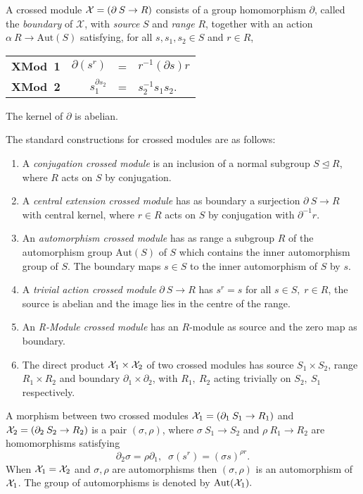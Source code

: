 A crossed module  ${\cal X} = (\partial \: S \to R )$ 
consists of a group homomorphism $\partial $, 
called the {\em boundary} of $\mathcal{X}$, 
with {\em source} $S$  and {\em range} $R$,
together with an action 
$\alpha \: R \to \mathrm{Aut}(S)$ satisfying,  
for all $s,s_1,s_2 \in S$  and  $r \in R$,
\begin{center}
\begin{tabular}{c r c l }
\textbf{XMod\ 1\:} &  $\partial(s^r)$   &  =  &  $r^{-1} (\partial s) r$ \\
\textbf{XMod\ 2\:} &  $s_1^{\partial s_2}$  &  =  &  $s_2^{-1}s_1 s_2$.
\end{tabular}
\end{center}
The kernel of  $\partial$  is abelian.


The standard constructions for crossed modules are as follows:

\begin{enumerate}
\item A {\em conjugation crossed module}
      is an inclusion of a normal subgroup  $S \unlhd R$,
      where $R$ acts on $S$ by conjugation.
\item A {\em central extension crossed module} has as boundary a surjection
      $\partial \: S \to R$ with central kernel,
      where $r \in R$ acts on $S$ by conjugation with $\partial^{-1}r$.
\item An {\em automorphism crossed module} has as range a subgroup $R$
      of the automorphism group  $\mbox{Aut}(S)$  of  $S$
      which contains the inner automorphism group of $S$.
      The boundary maps $s \in S$  to the inner automorphism of $S$ by $s$.
\item A {\em trivial action crossed module}  $\partial \: S \to R$
      has  $s^r = s$  for all  $s \in S, \; r \in R$,  
      the source is abelian
      and the image lies in the centre of the range.
\item An {\em R-Module crossed module} has an $R$-module as source
      and the zero map as boundary.
\item The direct product  ${\cal X}_{1} \times {\cal X}_{2}$
      of two crossed modules has source  $S_1 \times S_2$,
      range  $R_1 \times R_2$  and boundary
      $\partial_1 \times \partial_2$,  with  $R_1,\ R_2$  acting
      trivially on  $S_2,\ S_1$  respectively.
\end{enumerate}

A morphism between two crossed modules 
${\cal X}_{1} = (\partial_1 \: S_1 \to R_1)$ and  
${\cal X}_{2} = (\partial_2 \: S_2 \to R_2)$ 
is a pair  $(\sigma, \rho)$, where 
$ \sigma \: S_1 \to S_2$ and $ \rho \: R_1 \to R_2$ 
are homomorphisms satisfying
$$
\partial_2 \sigma = \rho \partial_1, \; \;
\sigma(s^r) = (\sigma s)^{\rho r}.
$$
When ${\cal X}_{1} = {\cal X}_{2}$
and $ \sigma, \rho $ are automorphisms then 
$(\sigma, \rho)$  is an automorphism of ${\cal X}_1$. 
The group of automorphisms is denoted 
by $\mathrm{Aut}({\cal X}_1 ).$ 


